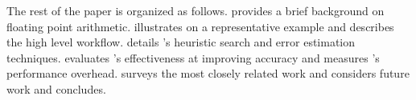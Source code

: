 \documentclass[paper.tex]{subfiles}
\begin{document}
The rest of the paper is organized as follows.  
provides a brief background on floating point arithmetic.
 illustrates \casio on a representative example and
describes the high level \casio workflow.  
details \casio's heuristic search and error estimation techniques.
 evaluates \casio's effectiveness at improving
accuracy and measures \casio's performance overhead.
 surveys the most closely related work and
 considers future work and concludes.









\end{document}
